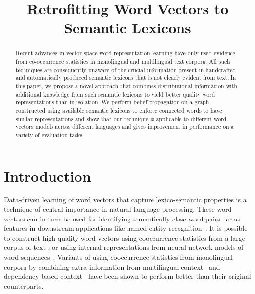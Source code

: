 \documentclass[11pt]{article}
\title{Retrofitting Word Vectors to Semantic Lexicons}
\begin{document}
\maketitle
\begin{abstract}
  Recent advances in vector space word representation learning have
  only used evidence from co-occurrence statistics in
  monolingual and multilingual text corpora. All such techniques are 
  consequently unaware of the
  crucial information present in handcrafted and automatically
  produced semantic lexicons that is not clearly evident from text. In this 
  paper, we propose a novel approach that combines distributional 
  information with additional knowledge from such semantic lexicons to 
  yield better quality word representations
  than in isolation. We perform belief propagation on a graph constructed
  using available semantic lexicons to enforce connected words to
  have similar representations and show that our technique is applicable to
  different word vectors models across different languages and gives improvement
  in performance on a variety of evaluation tasks.
\end{abstract}

\section{Introduction}
\label{sec:intro}

Data-driven learning of word vectors that capture lexico-semantic 
properties is a technique of central importance in natural language processing. 
These word vectors can in turn be used for identifying semantically close word 
pairs~\cite{Turney:2006:SSR:1174520.1174523,Agirre:2009:SSR:1620754.1620758} or as features
in downstream applications like named entity recognition~\cite{turian:2010}.
It is possible to construct high-quality word vectors using cooccurrence 
statistics from a large corpus of text 
\cite{deerwester-90}, or using internal representations from neural 
network models of word sequences~\cite{Collobert:2008:UAN:1390156.1390177}.
Variants of using cooccurrence statistics from monolingual corpora by combining
extra information from
multilingual context~\cite{zou-EtAl:2013:EMNLP,hermann2014multilingual,faruqui-dyer:2014:EACL2014}
and dependency-based context~\cite{Pado:2007:DCS:1268656.1268658}
have been shown to perform better than their original counterparts. 
\end{document}
